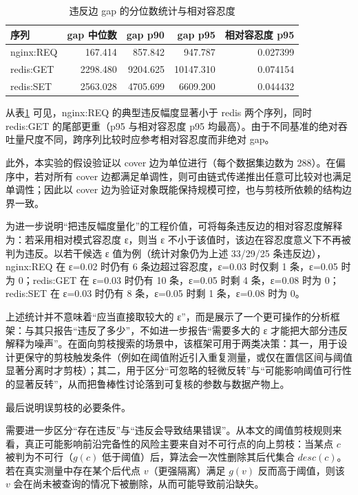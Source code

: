 \documentclass[UTF8,a4paper,12pt,twoside]{ctexart}  %
\begin{document}
\begin{table}[htbp]
  \centering
  \small
  \setlength{\tabcolsep}{4pt}
  \begin{tabular}{lrrrr}
    \toprule
    序列        & gap 中位数  & gap p90  & gap p95   & 相对容忍度 p95 \\
    \midrule
    nginx:REQ & 167.414  & 857.842  & 947.787   & 0.027399  \\
    redis:GET & 2298.480 & 9204.625 & 10147.310 & 0.074154  \\
    redis:SET & 2563.028 & 4705.699 & 6609.200  & 0.044432  \\
    \bottomrule
  \end{tabular}
  \caption{违反边 gap 的分位数统计与相对容忍度}
  \label{tab:gap-quantile-tail}
\end{table}

从表\ref{tab:gap-quantile-tail} 可见，nginx:REQ 的典型违反幅度显著小于 redis 两个序列，同时 redis:GET 的尾部更重（p95 与相对容忍度 p95 均最高）。由于不同基准的绝对吞吐量尺度不同，跨序列比较时应参考相对容忍度而非绝对 gap。

此外，本实验的假设验证以 cover 边为单位进行（每个数据集边数为
288）。在偏序中，若对所有 cover
边都满足单调性，则可由链式传递推出任意可比较对也满足单调性；因此以 cover
边为验证对象既能保持规模可控，也与剪枝所依赖的结构边界一致。

为进一步说明``把违反幅度量化''的工程价值，可将每条违反边的相对容忍度解释为：若采用相对模式容忍度
ε，则当 ε 不小于该值时，该边在容忍度意义下不再被判为违反。以若干候选 ε
值为例（统计对象仍为上述 33/29/25 条违反边），nginx:REQ 在 ε=0.02 时仍有
6 条边超过容忍度，ε=0.03 时仅剩 1 条，ε=0.05 时为 0；redis:GET 在 ε=0.03
时仍有 10 条，ε=0.05 时剩 4 条，ε=0.08 时为 0；redis:SET 在 ε=0.03
时仍有 8 条，ε=0.05 时剩 1 条，ε=0.08 时为 0。

上述统计并不意味着``应当直接取较大的
ε''，而是展示了一个更可操作的分析框架：与其只报告``违反了多少''，不如进一步报告``需要多大的
ε
才能把大部分违反解释为噪声''。在面向剪枝搜索的场景中，该框架可用于两类决策：其一，用于设计更保守的剪枝触发条件（例如在阈值附近引入重复测量，或仅在置信区间与阈值显著分离时才剪枝）；其二，用于区分``可忽略的轻微反转''与``可能影响阈值可行性的显著反转''，从而把鲁棒性讨论落到可复核的参数与数据产物上。

最后说明误剪枝的必要条件。

需要进一步区分``存在违反''与``违反会导致结果错误''。从本文的阈值剪枝规则来看，真正可能影响前沿完备性的风险主要来自对不可行点的向上剪枝：当某点
\(c\) 被判为不可行（\(g(c)\) 低于阈值）后，算法会一次性删除其后代集合
\(desc(c)\)。若在真实测量中存在某个后代点 \(v\)（更强隔离）满足 \(g(v)\)
反而高于阈值，则该 \(v\)
会在尚未被查询的情况下被删除，从而可能导致前沿缺失。
\end{document}
